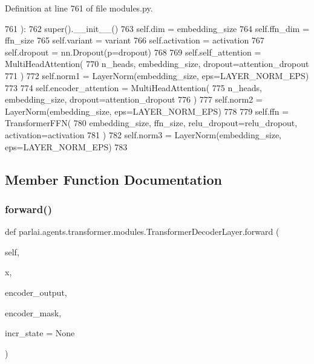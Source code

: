 Definition at line 761 of file modules.\+py.


\begin{DoxyCode}
761     ):
762         super().\_\_init\_\_()
763         self.dim = embedding\_size
764         self.ffn\_dim = ffn\_size
765         self.variant = variant
766         self.activation = activation
767         self.dropout = nn.Dropout(p=dropout)
768 
769         self.self\_attention = MultiHeadAttention(
770             n\_heads, embedding\_size, dropout=attention\_dropout
771         )
772         self.norm1 = LayerNorm(embedding\_size, eps=LAYER\_NORM\_EPS)
773 
774         self.encoder\_attention = MultiHeadAttention(
775             n\_heads, embedding\_size, dropout=attention\_dropout
776         )
777         self.norm2 = LayerNorm(embedding\_size, eps=LAYER\_NORM\_EPS)
778 
779         self.ffn = TransformerFFN(
780             embedding\_size, ffn\_size, relu\_dropout=relu\_dropout, activation=activation
781         )
782         self.norm3 = LayerNorm(embedding\_size, eps=LAYER\_NORM\_EPS)
783 
\end{DoxyCode}


\subsection{Member Function Documentation}
\mbox{\label{classparlai_1_1agents_1_1transformer_1_1modules_1_1TransformerDecoderLayer_a7b6ccf1e786de774f14397ec6368f342}} 
\subsubsection{\texorpdfstring{forward()}{forward()}}
{\footnotesize\ttfamily def parlai.\+agents.\+transformer.\+modules.\+Transformer\+Decoder\+Layer.\+forward (\begin{DoxyParamCaption}\item[{}]{self,  }\item[{}]{x,  }\item[{}]{encoder\+\_\+output,  }\item[{}]{encoder\+\_\+mask,  }\item[{}]{incr\+\_\+state = {\ttfamily None} }\end{DoxyParamCaption})}

